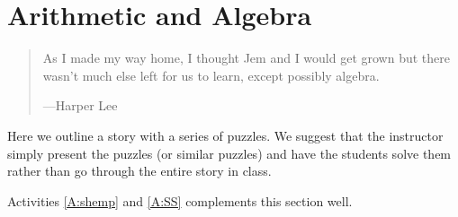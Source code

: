 \chapter{Arithmetic and Algebra}

\begin{quote}
As I made my way home, I thought Jem and I would get grown but there
wasn't much else left for us to learn, except possibly algebra.

\hfill---Harper Lee
\end{quote}

\begin{teachingnote}
Here we outline a story with a series of puzzles. We suggest that the
instructor simply present the puzzles (or similar puzzles) and have
the students solve them rather than go through the entire story in class.
\end{teachingnote}


\begin{activitynote}
Activities \ref{A:shemp} and \ref{A:SS} complements this section well.  %
\end{activitynote}

